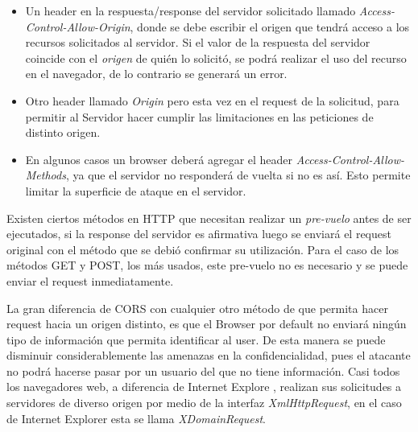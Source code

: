         \begin{itemize}
            \item Un header en la respuesta/response del servidor solicitado llamado \textit{Access-Control-Allow-Origin}, donde se debe escribir el origen que tendrá acceso a los recursos solicitados al servidor. Si el valor de la respuesta del servidor coincide con el \textit{origen} de quién lo solicitó, se podrá realizar el uso del recurso en el navegador, de lo contrario se generará un error.

            \item Otro header llamado \textit{Origin} pero esta vez en el request de la solicitud, para permitir al Servidor hacer cumplir las limitaciones en las peticiones de distinto origen.

            \item En algunos casos un browser deberá agregar el header \textit{Access-Control-Allow-Methods}, ya que el servidor no responderá de vuelta si no es así. Esto permite limitar la superficie de ataque en el servidor.

        \end{itemize}
        Existen ciertos métodos en HTTP que necesitan realizar un \textit{pre-vuelo} antes de ser ejecutados, si la response del servidor es afirmativa luego se enviará el request original con el método que se debió confirmar su utilización. Para el caso de los métodos GET y POST, los más usados, este pre-vuelo no es necesario y se puede enviar el request inmediatamente.
        
        La gran diferencia de CORS con cualquier otro método de que permita hacer request hacia un origen distinto, es que el Browser por default no enviará ningún tipo de información que permita identificar al user. De esta manera se puede disminuir considerablemente las amenazas en la confidencialidad, pues el atacante no podrá hacerse pasar por un usuario del que no tiene información. Casi todos los navegadores web, a diferencia de Internet Explore \cite{bookWebAppSec}, realizan sus solicitudes a servidores de diverso origen por medio de la interfaz \textit{XmlHttpRequest}, en el caso de Internet Explorer esta se llama \textit{XDomainRequest}.


